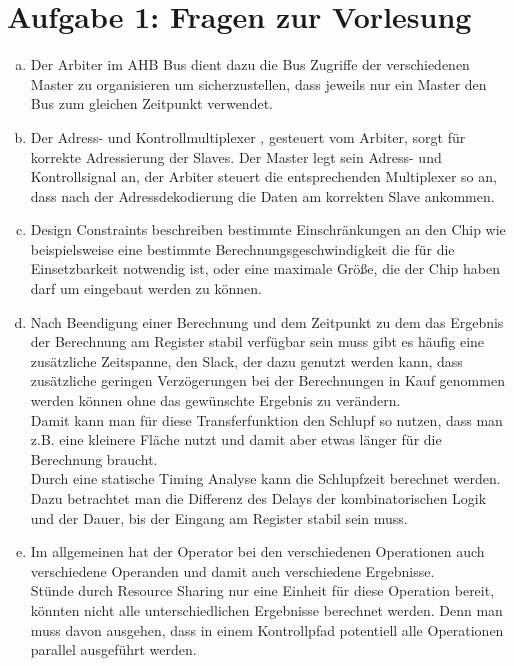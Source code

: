 \documentclass[a4paper]{scrartcl}
\begin{document}
	
	\section*{Aufgabe 1: Fragen zur Vorlesung}
	
	\begin{enumerate}[(a)]
		\item Der Arbiter im AHB Bus dient dazu die Bus Zugriffe der verschiedenen Master zu organisieren um sicherzustellen, dass jeweils nur ein Master den Bus zum gleichen Zeitpunkt verwendet.
		\item Der Adress- und Kontrollmultiplexer , gesteuert vom Arbiter, sorgt für korrekte Adressierung der Slaves. Der Master legt sein Adress- und Kontrollsignal an, der Arbiter steuert die entsprechenden Multiplexer so an, dass nach der Adressdekodierung die Daten am korrekten Slave ankommen.
		\item Design Constraints beschreiben bestimmte Einschränkungen an den Chip wie beispielsweise eine bestimmte Berechnungsgeschwindigkeit die für die Einsetzbarkeit notwendig ist, oder eine maximale Größe, die der Chip haben darf um eingebaut werden zu können.
		\item Nach Beendigung einer Berechnung und dem Zeitpunkt zu dem das Ergebnis der Berechnung am Register stabil verfügbar sein muss gibt es häufig eine zusätzliche Zeitspanne, den Slack, der dazu genutzt werden kann, dass zusätzliche geringen Verzögerungen bei der Berechnungen in Kauf genommen werden können ohne das gewünschte Ergebnis zu verändern.\\
		Damit kann man für diese Transferfunktion den Schlupf so nutzen, dass man z.B. eine kleinere Fläche nutzt und damit aber etwas länger für die Berechnung braucht.\\
		Durch eine statische Timing Analyse kann die Schlupfzeit berechnet werden. Dazu betrachtet man die Differenz des Delays der kombinatorischen Logik und der Dauer, bis der Eingang am Register stabil sein muss.
		
		\item Im allgemeinen hat der Operator bei den verschiedenen Operationen auch verschiedene Operanden und damit auch verschiedene Ergebnisse.\\
		Stünde durch Resource Sharing nur eine Einheit für diese Operation bereit, könnten nicht alle unterschiedlichen Ergebnisse berechnet werden. Denn man muss davon ausgehen, dass in einem Kontrollpfad potentiell alle Operationen parallel ausgeführt werden.
		
	\end{enumerate}
	\newpage
\end{document}
